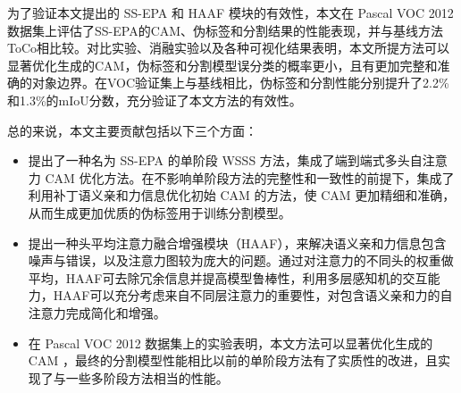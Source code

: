 \begin{CJK*}{UTF8}{fs}
	为了验证本文提出的 SS-EPA 和 HAAF 模块的有效性，本文在 Pascal VOC 2012数据集上评估了SS-EPA的CAM、伪标签和分割结果的性能表现，并与基线方法ToCo\cite{03ru2023token}相比较。对比实验、消融实验以及各种可视化结果表明，本文所提方法可以显著优化生成的CAM，伪标签和分割模型误分类的概率更小，且有更加完整和准确的对象边界。在VOC验证集上与基线相比，伪标签和分割性能分别提升了2.2\%和1.3\%的mIoU分数，充分验证了本文方法的有效性。

    总的来说，本文主要贡献包括以下三个方面：
    \begin{itemize}
        \item 提出了一种名为 SS-EPA 的单阶段 WSSS 方法，集成了端到端式多头自注意力 CAM 优化方法。在不影响单阶段方法的完整性和一致性的前提下，集成了利用补丁语义亲和力信息优化初始 CAM 的方法，使 CAM 更加精细和准确，从而生成更加优质的伪标签用于训练分割模型。
        \item 提出一种头平均注意力融合增强模块（HAAF），来解决语义亲和力信息包含噪声与错误，以及注意力图较为庞大的问题。通过对注意力的不同头的权重做平均，HAAF可去除冗余信息并提高模型鲁棒性，利用多层感知机的交互能力，HAAF可以充分考虑来自不同层注意力的重要性，对包含语义亲和力的自注意力完成简化和增强。
        \item 在 Pascal VOC 2012 数据集上的实验表明，本文方法可以显著优化生成的 CAM ，最终的分割模型性能相比以前的单阶段方法有了实质性的改进，且实现了与一些多阶段方法相当的性能。
    \end{itemize}
\end{CJK*}